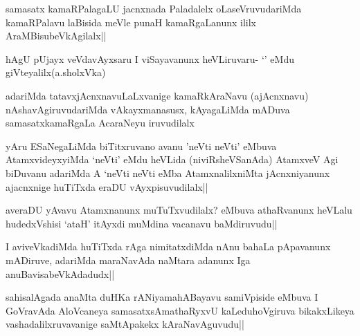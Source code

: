 \begin{artha}
samasatx kamaRPalagaLU jacnxnada Paladalelx oLaseVruvudariMda kamaRPalavu laBisida meVle punaH kamaRgaLanunx ililx AraMBisubeVkAgilalx||
\end{artha}

\begin{artha}
hAgU pUjayx veVdavAyxsaru I viSayavanunx heVLiruvaru- `\stext' eMdu giVteyalilx(a.sholxVka)
\end{artha}

\begin{artha}
adariMda tatavxjAcnxnavuLaLxvanige kamaRkAraNavu (ajAcnxnavu) nAshavAgiruvudariMda vAkayxmanasusx, kAyagaLiMda mADuva samasatxkamaRgaLa AcaraNeyu iruvudilalx
\end{artha}

\begin{artha}
yAru ESaNegaLiMda biTitxruvano avanu 'neVti neVti' eMbuva AtamxvideyxyiMda `neVti' eMdu heVLida (niviRsheVSanAda) AtamxveV Agi biDuvanu adariMda A `neVti neVti eMba AtamxnalilxniMta jAcnxniyanunx ajacnxnige huTiTxda eraDU vAyxpisuvudilalx||
\end{artha}

\begin{artha}
averaDU yAvavu Atamxnanunx muTuTxvudilalx? eMbuva athaRvanunx heVLalu hudedxVshisi `ataH' itAyxdi muMdina vacanavu baMdiruvudu||
\end{artha}



\begin{artha}
I aviveVkadiMda huTiTxda rAga nimitatxdiMda nAnu bahaLa pApavanunx mADiruve, adariMda maraNavAda naMtara adanunx Iga anuBavisabeVkAdadudx||
\end{artha}

\begin{artha}
sahisalAgada anaMta duHKa rANiyamahABayavu samiVpiside eMbuva I GoVravAda  AloVcaneya samasatxsAmathaRyxvU kaLeduhoVgiruva bikakxLikeya vashadalilxruvavanige saMtApakekx kAraNavAguvudu||
\end{artha}

